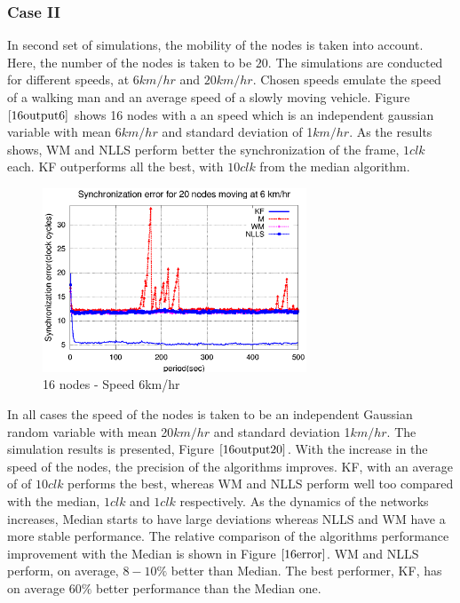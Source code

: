 \documentclass[a4paper,10pt]{report}
\begin{document}
\subsubsection{\textbf{Case II}}
In second set of simulations, the mobility of the nodes is taken into account. Here, the number of the nodes is taken to be $20$. The simulations are conducted for different speeds, at $6km/hr$ and $20km/hr$. Chosen speeds emulate the speed of a walking man and an average speed of a slowly moving vehicle. 
\newline 
Figure $\ref{16output6}$ shows 16 nodes with a an speed which is an independent gaussian variable with mean $6km/hr$ and standard deviation of 1$km/hr$. As the results shows, WM and NLLS perform better the synchronization of the frame, $1 clk$ each. KF outperforms all the best, with $10 clk$ from the median algorithm.
\newline
\begin{figure}
\centering
\includegraphics[width=0.7\textwidth]{16output-s6}
\caption{16 nodes - Speed 6km/hr} \label{16output6}
\end{figure}
In all cases the speed of the nodes is taken to be an independent Gaussian random variable with mean 20$km/hr$ and standard deviation 1$km/hr$.
The simulation results is presented, Figure $\ref{16output20}$. With the increase in the speed of the nodes, the precision of the algorithms improves. KF, with an average of of $10 clk$ performs the best, whereas WM and NLLS perform well too compared with the median, $1 clk$ and $1 clk$ respectively. As the dynamics of the networks increases, Median starts to have large deviations whereas NLLS and WM have a more stable performance. 
\newline 
The relative comparison of the algorithms performance improvement with the Median is shown in Figure $\ref{16error}$. WM and NLLS perform, on average, $8-10\%$ better than Median. The best performer, KF, has on average $60\%$ better performance than the Median one.
\end{document}

